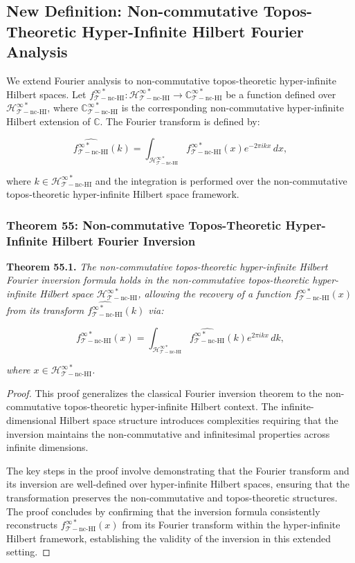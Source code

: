 \documentclass{article}
\begin{document}
\subsection{New Definition: Non-commutative Topos-Theoretic Hyper-Infinite Hilbert Fourier Analysis}
We extend Fourier analysis to non-commutative topos-theoretic hyper-infinite Hilbert spaces. Let \(f_{\mathcal{T}-\text{nc-HI}}^{\infty *}: \mathcal{H}_{\mathcal{T}-\text{nc-HI}}^{\infty *} \to \mathbb{C}_{\mathcal{T}-\text{nc-HI}}^{\infty *}\) be a function defined over \(\mathcal{H}_{\mathcal{T}-\text{nc-HI}}^{\infty *}\), where \(\mathbb{C}_{\mathcal{T}-\text{nc-HI}}^{\infty *}\) is the corresponding non-commutative hyper-infinite Hilbert extension of \(\mathbb{C}\). The Fourier transform is defined by:

\[
\widehat{f_{\mathcal{T}-\text{nc-HI}}^{\infty *}}(k) = \int_{\mathcal{H}_{\mathcal{T}-\text{nc-HI}}^{\infty *}} f_{\mathcal{T}-\text{nc-HI}}^{\infty *}(x) e^{-2\pi i k x} \, dx,
\]

where \(k \in \mathcal{H}_{\mathcal{T}-\text{nc-HI}}^{\infty *}\) and the integration is performed over the non-commutative topos-theoretic hyper-infinite Hilbert space framework.

\subsubsection{Theorem 55: Non-commutative Topos-Theoretic Hyper-Infinite Hilbert Fourier Inversion}
\textbf{Theorem 55.1.} \textit{The non-commutative topos-theoretic hyper-infinite Hilbert Fourier inversion formula holds in the non-commutative topos-theoretic hyper-infinite Hilbert space \(\mathcal{H}_{\mathcal{T}-\text{nc-HI}}^{\infty *}\), allowing the recovery of a function \(f_{\mathcal{T}-\text{nc-HI}}^{\infty *}(x)\) from its transform \(\widehat{f_{\mathcal{T}-\text{nc-HI}}^{\infty *}}(k)\) via:}

\[
f_{\mathcal{T}-\text{nc-HI}}^{\infty *}(x) = \int_{\mathcal{H}_{\mathcal{T}-\text{nc-HI}}^{\infty *}} \widehat{f_{\mathcal{T}-\text{nc-HI}}^{\infty *}}(k) e^{2\pi i k x} \, dk,
\]

\textit{where \(x \in \mathcal{H}_{\mathcal{T}-\text{nc-HI}}^{\infty *}\).}

\begin{proof}
This proof generalizes the classical Fourier inversion theorem to the non-commutative topos-theoretic hyper-infinite Hilbert context. The infinite-dimensional Hilbert space structure introduces complexities requiring that the inversion maintains the non-commutative and infinitesimal properties across infinite dimensions.

The key steps in the proof involve demonstrating that the Fourier transform and its inversion are well-defined over hyper-infinite Hilbert spaces, ensuring that the transformation preserves the non-commutative and topos-theoretic structures. The proof concludes by confirming that the inversion formula consistently reconstructs \(f_{\mathcal{T}-\text{nc-HI}}^{\infty *}(x)\) from its Fourier transform within the hyper-infinite Hilbert framework, establishing the validity of the inversion in this extended setting.
\end{proof}
\end{document}
